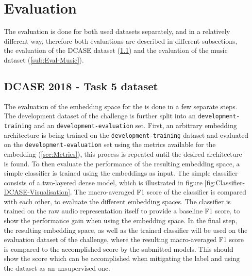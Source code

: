 \section{Evaluation}
\label{sec:Evaluation}
The evaluation is done for both used datasets separately, and in a relatively different way, therefore both evaluations are described in different subsections, the evaluation of the DCASE dataset (\ref{sub:Eval-DCASE}) and the evaluation of the music dataset (\ref{sub:Eval-Music}).

\subsection{DCASE 2018 - Task 5 dataset}
\label{sub:Eval-DCASE}
The evaluation of the embedding space for the  is done in a few separate steps. The development dataset of the challenge is further split into an \texttt{development-training} and an \texttt{development-evaluation} set. First, an arbitrary embedding architecture is being trained on the \texttt{development-training} dataset and evaluated on the \texttt{development-evaluation} set using the metrics available for the embedding (\ref{sec:Metrics}), this process is repeated until the desired architecture is found.
\newline
\newline
To then evaluate the performance of the resulting embedding space, a simple classifier is trained using the embeddings as input. The simple classifier consists of a two-layered dense model, which is illustrated in figure \ref{fig:Classifier-DCASE-Visualisation}. The macro-averaged F1 score of the classifier is compared with each other, to evaluate the different embedding spaces. The classifier is trained on the raw audio representation itself to provide a baseline F1 score, to show the performance gain when using the embedding space.
\newline
\newline
In the final step, the resulting embedding space, as well as the trained classifier will be used on the evaluation dataset of the challenge, where the resulting macro-averaged F1 score is compared to the accomplished score by the submitted models. This should show the score which can be accomplished when mitigating the label and using the dataset as an unsupervised one.

